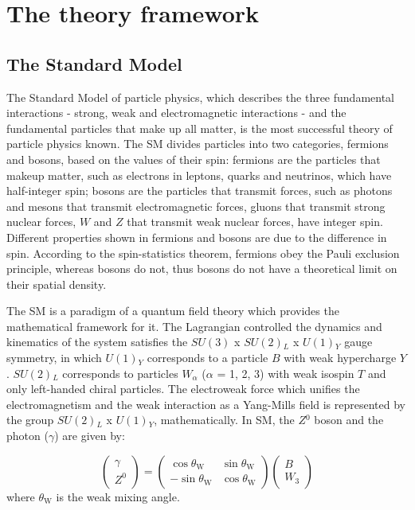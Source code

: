 \documentclass[UTF8,12pt]{ctexart}
\numberwithin{equation}{section}
\def\ga{\gamma}
\begin{document}
\section{The theory framework}
\label{sec:2}
\subsection{The Standard Model}
\label{sec:2.1}

The Standard Model of particle physics, which describes the three fundamental interactions - strong, weak and electromagnetic interactions - and the fundamental particles that make up all matter, is the most successful theory of particle physics known.
The SM divides particles into two categories, fermions and bosons, based on the values of their spin: fermions are the particles that makeup matter, such as electrons in leptons, quarks and neutrinos, which have half-integer spin; bosons are the particles that transmit forces, such as photons and mesons that transmit electromagnetic forces, gluons that transmit strong nuclear forces, $W$ and $Z$ that transmit weak nuclear forces, have integer spin.  Different properties shown in fermions and bosons are due to the difference in spin. According to the spin-statistics theorem, fermions obey the Pauli exclusion principle, whereas bosons do not, thus bosons do not have a theoretical limit on their spatial density.

The SM is a paradigm of a quantum field theory which provides the mathematical framework for it. The Lagrangian controlled the dynamics and kinematics of the system satisfies the $SU(3)$ x $SU(2)$$_L$ x $U(1)$$_Y$ gauge symmetry, in which $U(1)$$_Y$ corresponds to a particle $B$ with weak hypercharge $Y$. $SU(2)$$_L$ corresponds to particles $W$$_\alpha$ ($\alpha$ = 1, 2, 3) with weak isospin $T$ and only left-handed chiral particles. The electroweak force which unifies the electromagnetism and the weak interaction as a Yang-Mills field is represented by the group $SU(2)$$_L$ x $U(1)$$_Y$, mathematically. In SM, the $Z$$^0$ boson and the photon ($\ga$) are given by: 

\begin{equation}
\left(\begin{array}{c}\gamma \\ Z^{0}\end{array}\right)=\left(\begin{array}{cc}\cos \theta_{\mathrm{W}} & \sin \theta_{\mathrm{W}} \\ -\sin \theta_{\mathrm{W}} & \cos \theta_{\mathrm{W}}\end{array}\right)\left(\begin{array}{c}B \\ W_{3}\end{array}\right)
\end{equation}
where $\theta_{\mathrm{W}}$ is the weak mixing angle. 
\end{document}
